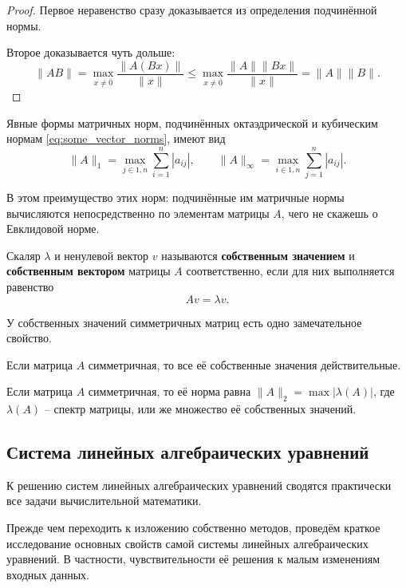 \documentclass{article}
\begin{document}
\begin{proof}
	Первое неравенство сразу доказывается из определения подчинённой нормы.

	Второе доказывается чуть дольше:
	\[\|AB\|=\max_{x\ne\overline{0}}\frac{\|A(Bx)\|}{\|x\|}\le
	\max_{x\ne\overline{0}}\frac{\|A\|\|Bx\|}{\|x\|}=\|A\|\|B\|.\]
\end{proof}

\begin{lemma}
	Явные формы матричных норм, подчинённых октаэдрической и кубическим
	нормам \eqref{eq:some_vector_norms}, имеют вид
	\[\|A\|_1=\max_{j\in\overline{1,n}}\sum_{i=1}^{n}|a_{ij}|,\qquad
	\|A\|_\infty=\max_{i\in\overline{1,n}}\sum_{j=1}^{n}|a_{ij}|.\]
\end{lemma}

\proofexercise

В этом преимущество этих норм: подчинённые им матричные нормы вычисляются
непосредственно по элементам матрицы $A$, чего не скажешь о Евклидовой норме.

\begin{define}
	Скаляр $\lambda$ и ненулевой вектор $v$ называются \textbf{собственным
	значением} и \textbf{собственным вектором} матрицы $A$ соответственно,
	если для них выполняется равенство
	\[Av=\lambda v.\]
\end{define}

У собственных значений симметричных матриц есть одно замечательное свойство.
\begin{lemma}
	Если матрица $A$ симметричная, то все её собственные значения
	действительные.
\end{lemma}

\begin{theorem}
	Если матрица $A$ симметричная, то её норма равна $\|A\|_2=
	\max|\lambda(A)|$, где $\lambda(A)$ -- спектр матрицы, или же множество
	её собственных значений.
\end{theorem}
\newpage

\subsection{Система линейных алгебраических уравнений}
К решению систем линейных алгебраических уравнений сводятся практически все
задачи вычислительной математики.

Прежде чем переходить к изложению собственно методов, проведём краткое
исследование основных свойств самой системы линейных алгебраических уравнений. В
частности, чувствительности её решения к малым изменениям входных данных.
\end{document}
